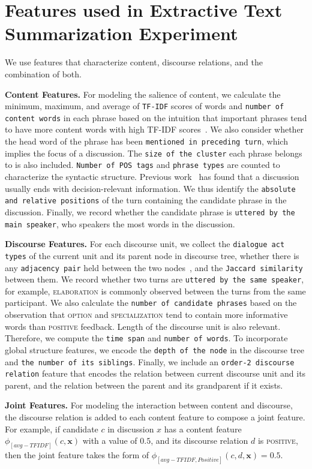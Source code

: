 \chapter{Features used in Extractive Text Summarization Experiment}
\label{sec:feature}
We use features that characterize content, discourse relations, and the combination of both.

\noindent \textbf{Content Features.} 
For modeling the salience of content, we calculate the minimum, maximum, and average of \texttt{TF-IDF} scores of words and \texttt{number of content words} in each phrase based on the intuition that important phrases tend to have more content words with high TF-IDF scores~\cite{FernandezFDAEP08}. We also consider whether the head word of the phrase has been \texttt{mentioned in preceding turn}, which implies the focus of a discussion. The \texttt{size of the cluster} each phrase belongs to is also included. 
\texttt{Number of POS tags} and \texttt{phrase types} are counted to characterize the syntactic structure. Previous work~\cite{wang-cardie:2012:SIGDIAL20122} has found that a discussion usually ends with decision-relevant information. We thus identify the \texttt{absolute and relative positions} of the turn containing the candidate phrase in the discussion. Finally, we record whether the candidate phrase is \texttt{uttered by the main speaker}, who speakers the most words in the discussion. 


\noindent \textbf{Discourse Features.} 
For each discourse unit, we collect the \texttt{dialogue act types} of the current unit and its parent node in discourse tree, whether there is any \texttt{adjacency pair} held between the two nodes~\cite{hakkani2009towards}, and the \texttt{Jaccard similarity} between them.
%
We record whether two turns are \texttt{uttered by the same speaker}, for example, \textsc{elaboration} is commonly observed between the turns from the same participant. 
%
We also calculate the \texttt{number of candidate phrases} based on the observation that \textsc{option} and \textsc{specialization} tend to contain more informative words than \textsc{positive} feedback. 
Length of the discourse unit is also relevant. Therefore, we compute the \texttt{time span} and \texttt{number of words}.  
To incorporate global structure features, we encode the \texttt{depth of the node} in the discourse tree and \texttt{the number of its siblings}. 
%
Finally, we include an \texttt{order-2 discourse relation} feature that encodes the relation between current discourse unit and its parent, and the relation between the parent and its grandparent if it exists. 


\noindent \textbf{Joint Features.} For modeling the interaction between content and discourse, the discourse relation is added to each content feature to compose a joint feature. For example, if candidate $c$ in discussion $x$ has a content feature $\phi_{[avg-TFIDF]} (c, \mathbf{x})$ with a value of $0.5$, and its discourse relation $d$ is \textsc{positive}, then the joint feature takes the form of $\phi_{[avg-TFIDF, Positive]} (c, d, \mathbf{x})=0.5$. 
